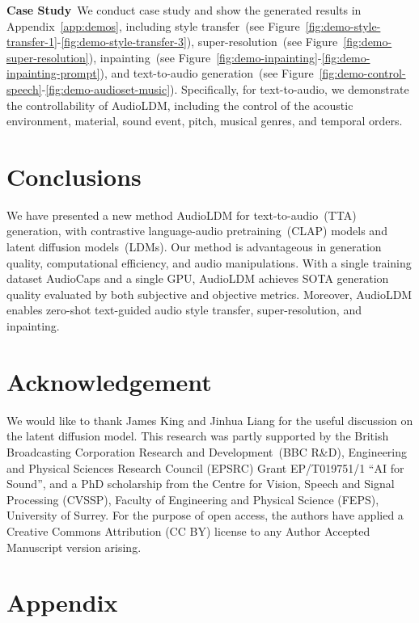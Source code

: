 \textbf{Case Study}~We conduct case study and show the generated results in Appendix~\ref{app:demos}, including style transfer~(see Figure~\ref{fig:demo-style-transfer-1}-\ref{fig:demo-style-transfer-3}), super-resolution~(see Figure~\ref{fig:demo-super-resolution}), inpainting~(see Figure~\ref{fig:demo-inpainting}-\ref{fig:demo-inpainting-prompt}), and text-to-audio generation~(see Figure~\ref{fig:demo-control-speech}-\ref{fig:demo-audioset-music}). Specifically, for text-to-audio, we demonstrate the controllability of AudioLDM, including the control of the acoustic environment, material, sound event, pitch, musical genres, and temporal orders.

\section{Conclusions}
\label{Conclusion}
We have presented a new method AudioLDM for text-to-audio~(TTA) generation, with contrastive language-audio pretraining~(CLAP) models and latent diffusion models~(LDMs). Our method is advantageous in generation quality, computational efficiency, and audio manipulations. With a single training dataset AudioCaps and a single GPU, AudioLDM achieves SOTA generation quality evaluated by both subjective and objective metrics. Moreover, AudioLDM enables zero-shot text-guided audio style transfer, super-resolution, and inpainting.

\section{Acknowledgement}
\label{sec:ack}
We would like to thank James King and Jinhua Liang for the useful discussion on the latent diffusion model. This research was partly supported by the British Broadcasting Corporation Research and Development~(BBC R\&D), Engineering and Physical Sciences Research Council (EPSRC) Grant EP/T019751/1 ``AI for Sound'', and a PhD scholarship from the Centre for Vision, Speech and Signal Processing (CVSSP), Faculty of Engineering and Physical Science (FEPS), University of Surrey. For the purpose of open access, the authors have applied a Creative Commons Attribution (CC BY) license to any Author Accepted Manuscript version arising.

\newpage
\onecolumn
\section*{Appendix}
\label{sec:appendix}


